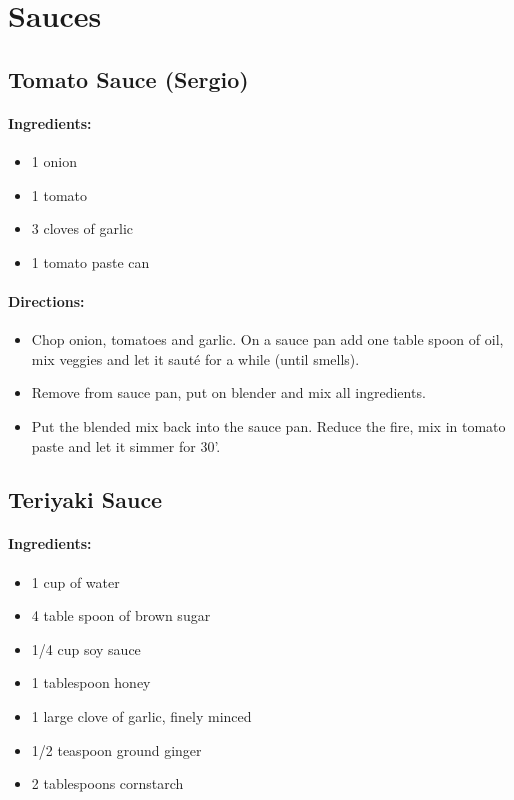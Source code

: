\documentclass{article}
\begin{document}
\section{Sauces}

\subsection{Tomato Sauce (Sergio)}

\paragraph{Ingredients:}

\begin{itemize}
	\item 1 onion 
	\item 1 tomato 
	\item 3 cloves of garlic 
	\item 1 tomato paste can
\end{itemize}

\paragraph{Directions:}
\begin{itemize}
	\item Chop onion, tomatoes and garlic. On a sauce pan add one table spoon of oil, mix veggies and let it sauté for a while (until smells). 
	\item Remove from sauce pan, put on blender and mix all ingredients. 
	\item Put the blended mix back into the sauce pan. Reduce the fire, mix in tomato paste and let it simmer for 30'.
\end{itemize}

\subsection{Teriyaki Sauce}

\paragraph{Ingredients:}

\begin{itemize}
	\item 1 cup of water
	\item 4 table spoon of brown sugar
	\item 1/4 cup soy sauce
	\item 1 tablespoon honey
	\item 1 large clove of garlic, finely minced
	\item 1/2 teaspoon ground ginger
	\item 2 tablespoons cornstarch
\end{itemize}
\end{document}
